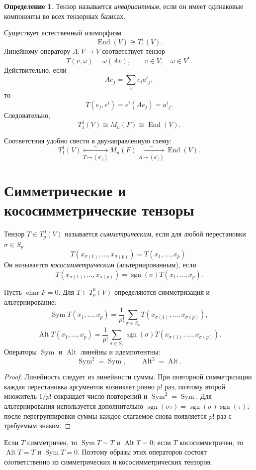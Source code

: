 \documentclass[12pt,a4paper,oneside,openany]{book}
\theoremstyle{definition}
\newtheorem{definition}{Определение}[chapter]
\theoremstyle{plain}
\theoremstyle{remark}
\DeclareMathOperator{\sgn}{sgn}
\begin{document}
\begin{definition}
Тензор называется \emph{инвариантным}, если он имеет одинаковые
компоненты во всех тензорных базисах.
\end{definition}

Существует естественный изоморфизм
\[
  \operatorname{End}(V)\cong T_1^1(V).
\]
Линейному оператору $A\colon V\to V$ соответствует тензор
\[
  T(v,\omega)=\omega(Av),
  \qquad v\in V,\quad \omega\in V^*.
\]
Действительно, если
\[
  Ae_j=\sum_i e_i a^i{}_j,
\]
то
\[
  T(e_j,e^i)=e^i(Ae_j)=a^i{}_j.
\]
Следовательно,
\[
  T_1^1(V)\cong M_n(F)\cong\operatorname{End}(V).
\]

Соответствия удобно свести в двунаправленную схему:
\[
  T_1^1(V)
  \underset{T\longmapsto(a^i{}_j)}{\stackrel{\sim}{\longleftrightarrow}}
  M_n(F)
  \underset{A\longmapsto(a^i{}_j)}{\stackrel{\sim}{\longleftrightarrow}}
  \operatorname{End}(V).
\]

\section{Симметрические и кососимметрические тензоры}

Тензор $T\in T_p^0(V)$ называется \emph{симметрическим}, если для любой
перестановки $\sigma\in S_p$
\[
  T(x_{\sigma(1)},\ldots,x_{\sigma(p)})
  =T(x_1,\ldots,x_p).
\]
Он называется \emph{кососимметрическим} (альтернированным), если
\[
  T(x_{\sigma(1)},\ldots,x_{\sigma(p)})
  =\sgn(\sigma)T(x_1,\ldots,x_p).
\]


Пусть $\operatorname{char}F=0$. Для $T\in T_p^0(V)$ определяются
симметризация и альтернирование:
\[
  \operatorname{Sym}T(x_1,\ldots,x_p)
  =\frac1{p!}\sum_{\sigma\in S_p}
  T(x_{\sigma(1)},\ldots,x_{\sigma(p)}),
\]
\[
  \operatorname{Alt}T(x_1,\ldots,x_p)
  =\frac1{p!}\sum_{\sigma\in S_p}\sgn(\sigma)
  T(x_{\sigma(1)},\ldots,x_{\sigma(p)}).
\]
Операторы $\operatorname{Sym}$ и $\operatorname{Alt}$ линейны и
идемпотентны:
\[
  \operatorname{Sym}^2=\operatorname{Sym},
  \qquad
  \operatorname{Alt}^2=\operatorname{Alt}.
\]

\begin{proof}
Линейность следует из линейности суммы. При повторной симметризации
каждая перестановка аргументов возникает ровно $p!$ раз, поэтому второй
множитель $1/p!$ сокращает число повторений и
$\operatorname{Sym}^2=\operatorname{Sym}$. Для альтернирования
используется дополнительно
$\sgn(\sigma\tau)=\sgn(\sigma)\sgn(\tau)$; после перегруппировки суммы
каждое слагаемое снова появляется $p!$ раз с требуемым знаком.
\end{proof}
Если $T$ симметричен, то
$\operatorname{Sym}T=T$ и $\operatorname{Alt}T=0$; если $T$
кососимметричен, то
$\operatorname{Alt}T=T$ и $\operatorname{Sym}T=0$. Поэтому образы этих
операторов состоят соответственно из симметрических и кососимметрических
тензоров.
\end{document}
